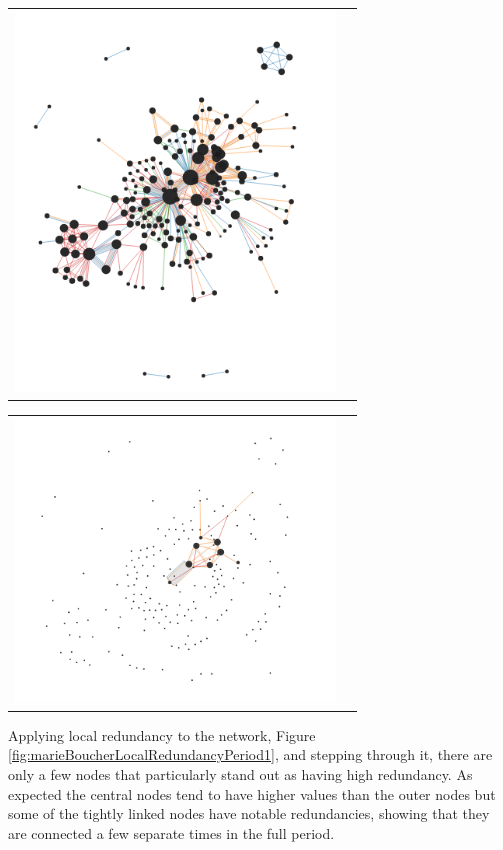 \begin{center}
\begin{tabular}{cc}
\includegraphics[trim={0 0 0 0}, width=85mm]{./Figures/marieBoucherLocalCentralityFull.png}
\end{tabular}
\label{fig:marieBoucherLocalCentralityFull}
\end{center}   


\begin{center}
\begin{tabular}{cc}
\includegraphics[trim={0 0 0 0}, width=85mm]{./Figures/marieBoucherLocalRedundancyPeriod1.png}
\end{tabular}
\label{fig:marieBoucherLocalRedundancyPeriod1}
\end{center}   
Applying local redundancy to the network, Figure \ref{fig:marieBoucherLocalRedundancyPeriod1}, and stepping through it, there are only a few nodes that particularly stand out as having high redundancy. As expected the central nodes tend to have higher values than the outer nodes but some of the tightly linked nodes have notable redundancies, showing that they are connected a few separate times in the full period.

